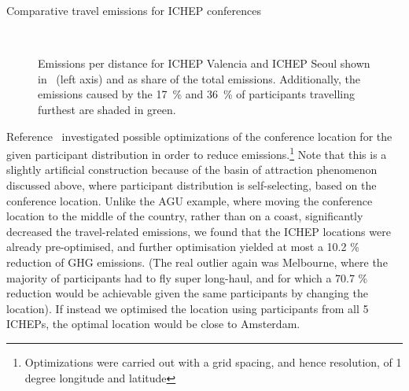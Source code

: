\documentclass[../SustainableHEP.tex]{subfiles}
\begin{document}
\begin{casestudy}{Comparative travel emissions for ICHEP conferences}
\begin{figure}
    \captionsetup{type=figure}
    \\
    \caption[Emissions per distance for two different ICHEP editions]{Emissions per distance for ICHEP Valencia and ICHEP Seoul shown in \tCdOe\ (left axis) and as share of the total emissions. Additionally, the emissions caused by the 17~\% and 36~\% of participants travelling furthest are shaded in green.}\label{fig:EmmPerDistance}
\end{figure}

Reference~\cite{RefAGU} investigated possible optimizations of the conference location for the given participant distribution in order to reduce emissions.\footnote{Optimizations were carried out with a grid spacing, and hence resolution, of 1 degree longitude and latitude}  Note that this is a slightly artificial construction because of the basin of attraction phenomenon discussed above, where participant distribution is self-selecting, based on the conference location. Unlike the AGU example, where moving the conference location to the middle of the country, rather than on a coast, significantly decreased the travel-related emissions, we found that the ICHEP locations were already pre-optimised, and further optimisation yielded at most a 10.2 \% reduction of GHG emissions.  (The real outlier again was Melbourne, where the majority of participants had to fly super long-haul, and for which a 70.7 \% reduction would be achievable given the same participants by changing the location).  If instead we optimised the location using participants from all 5 ICHEPs, the optimal location would be close to Amsterdam.


\end{casestudy}
\end{document}
